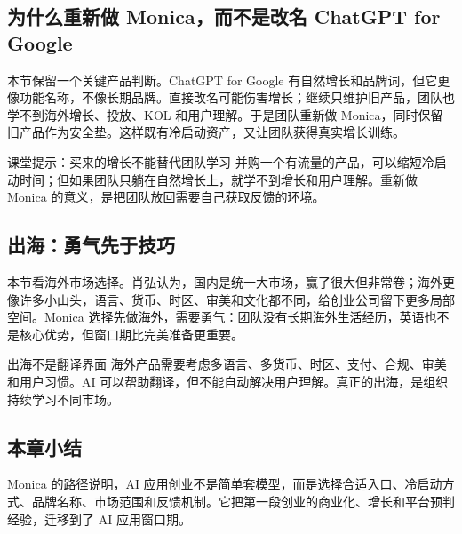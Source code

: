 \subsection{为什么重新做 Monica，而不是改名 ChatGPT for Google}

本节保留一个关键产品判断。ChatGPT for Google 有自然增长和品牌词，但它更像功能名称，不像长期品牌。直接改名可能伤害增长；继续只维护旧产品，团队也学不到海外增长、投放、KOL 和用户理解。于是团队重新做 Monica，同时保留旧产品作为安全垫。这样既有冷启动资产，又让团队获得真实增长训练。

\begin{importantbox}{课堂提示：买来的增长不能替代团队学习}
并购一个有流量的产品，可以缩短冷启动时间；但如果团队只躺在自然增长上，就学不到增长和用户理解。重新做 Monica 的意义，是把团队放回需要自己获取反馈的环境。
\end{importantbox}

\subsection{出海：勇气先于技巧}

本节看海外市场选择。肖弘认为，国内是统一大市场，赢了很大但非常卷；海外更像许多小山头，语言、货币、时区、审美和文化都不同，给创业公司留下更多局部空间。Monica 选择先做海外，需要勇气：团队没有长期海外生活经历，英语也不是核心优势，但窗口期比完美准备更重要。

\begin{warningbox}{出海不是翻译界面}
海外产品需要考虑多语言、多货币、时区、支付、合规、审美和用户习惯。AI 可以帮助翻译，但不能自动解决用户理解。真正的出海，是组织持续学习不同市场。
\end{warningbox}

\subsection{本章小结}

Monica 的路径说明，AI 应用创业不是简单套模型，而是选择合适入口、冷启动方式、品牌名称、市场范围和反馈机制。它把第一段创业的商业化、增长和平台预判经验，迁移到了 AI 应用窗口期。

